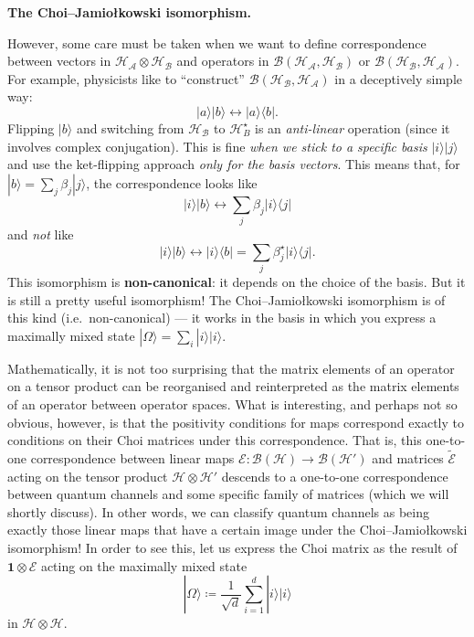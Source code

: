 \documentclass[fleqn,a4paper]{article}
\newenvironment{technical}[1]{\textbf{#1.}\par\vspace{.5\baselineskip}\everypar{\setlength{\parindent}{1.5em}}}{}
\theoremstyle{definition}
\theoremstyle{definition}
\theoremstyle{definition}
\theoremstyle{definition}
\theoremstyle{remark}
\begin{document}
\begin{technical}{The Choi–Jamiołkowski isomorphism}
However, some care must be taken when we want to define correspondence between vectors in \(\mathcal{H}_{\mathcal{A}}\otimes\mathcal{H}_{\mathcal{B}}\) and operators in \(\mathscr{B}(\mathcal{H}_{\mathcal{A}},\mathcal{H}_{\mathcal{B}})\) or \(\mathscr{B}(\mathcal{H}_{\mathcal{B}},\mathcal{H}_{\mathcal{A}})\).
For example, physicists like to ``construct'' \(\mathscr{B}(\mathcal{H}_{\mathcal{B}},\mathcal{H}_{\mathcal{A}})\) in a deceptively simple way:
\[
  |a\rangle|b\rangle \longleftrightarrow |a\rangle\langle b|.
\]
Flipping \(|b\rangle\) and switching from \(\mathcal{H}_{\mathcal{B}}\) to \(\mathcal{H}^\star_B\) is an \emph{anti-linear} operation (since it involves complex conjugation).
This is fine \emph{when we stick to a specific basis} \(|i\rangle|j\rangle\) and use the ket-flipping approach \emph{only for the basis vectors}.
This means that, for \(|b\rangle=\sum_j\beta_j|j\rangle\), the correspondence looks like
\[
  |i\rangle|b\rangle \longleftrightarrow \sum_j \beta_j |i\rangle\langle j|
\]
and \emph{not} like
\[
  |i\rangle|b\rangle \longleftrightarrow |i\rangle\langle b|
  = \sum_j \beta^\star_j |i\rangle\langle j|.
\]
This isomorphism is \textbf{non-canonical}: it depends on the choice of the basis.
But it is still a pretty useful isomorphism!
The Choi--Jamiołkowski isomorphism is of this kind (i.e.~non-canonical) --- it works in the basis in which you express a maximally mixed state \(|\Omega\rangle=\sum_i|i\rangle|i\rangle\).

\end{technical}

Mathematically, it is not too surprising that the matrix elements of an operator on a tensor product can be reorganised and reinterpreted as the matrix elements of an operator between operator spaces.
What is interesting, and perhaps not so obvious, however, is that the positivity conditions for maps correspond exactly to conditions on their Choi matrices under this correspondence.
That is, this one-to-one correspondence between linear maps \(\mathcal{E}\colon\mathcal{B}(\mathcal{H})\to\mathcal{B}(\mathcal{H}')\) and matrices \(\widetilde{\mathcal{E}}\) acting on the tensor product \(\mathcal{H}\otimes\mathcal{H}'\) descends to a one-to-one correspondence between quantum channels and some specific family of matrices (which we will shortly discuss).
In other words, we can classify quantum channels as being exactly those linear maps that have a certain image under the Choi--Jamiołkowski isomorphism!
In order to see this, let us express the Choi matrix as the result of \(\mathbf{1}\otimes\mathcal{E}\) acting on the maximally mixed state
\[
  |\Omega\rangle\coloneqq\frac{1}{\sqrt{d}}\sum_{i=1}^d|i\rangle|i\rangle
\]
in \(\mathcal{H}\otimes\mathcal{H}\).
\end{document}
